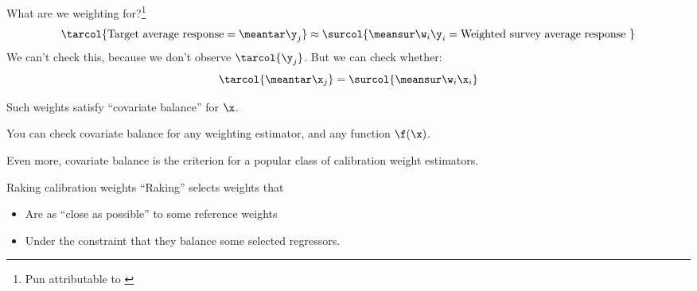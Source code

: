 

\begin{frame}[t]{What are we weighting for?\footnote{Pun attributable to \textcite{solon:2015:weightingfor}}}
$$
\tarcol{\textrm{Target average response} =
\meantar \y_j} \approx \surcol{\meansur \w_i \y_i
= \textrm{Weighted survey average response }}
$$
We can't check this, because we don't observe $\tarcol{\y_j}$.  \pause But we can check whether:
$$
    \tarcol{\meantar \x_j} = \surcol{\meansur \w_i \x_i}
$$

Such weights satisfy ``covariate balance'' for $\x$.

You can check covariate balance for any weighting estimator,
and any function $\f(\x)$.

\pause
Even more, covariate balance is the criterion for a popular class of calibration
weight estimators.

\begin{block}{Raking calibration weights}
``Raking'' selects weights that
\vspace{-0.5em}
\begin{itemize}
    \item Are as ``close as possible'' to some reference weights
    \item Under the constraint that they balance some selected regressors.
\end{itemize}
%
\end{block}



\end{frame}





